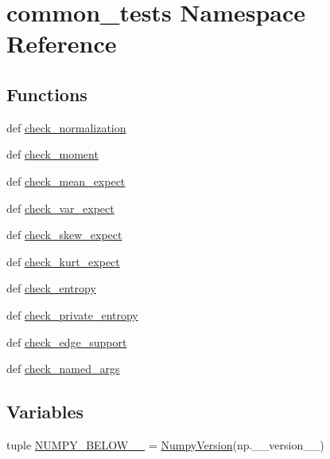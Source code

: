 \hypertarget{namespacecommon__tests}{}\section{common\+\_\+tests Namespace Reference}
\label{namespacecommon__tests}
\subsection*{Functions}
\begin{DoxyCompactItemize}
\item 
def \hyperlink{namespacecommon__tests_a8a5bd5cb9b9f81938b742d6a92508f01}{check\+\_\+normalization}
\item 
def \hyperlink{namespacecommon__tests_a24e7d5744f5a52cea9d94dac1453978c}{check\+\_\+moment}
\item 
def \hyperlink{namespacecommon__tests_a3b5de235c6d86d614e41aada38d5aa12}{check\+\_\+mean\+\_\+expect}
\item 
def \hyperlink{namespacecommon__tests_a172d6ae9ae9ba2d549aeaf00b774ddf3}{check\+\_\+var\+\_\+expect}
\item 
def \hyperlink{namespacecommon__tests_a35d5ac4a10a21e5b388c149d872e4578}{check\+\_\+skew\+\_\+expect}
\item 
def \hyperlink{namespacecommon__tests_a38730885c62e4d2e7b0e690a72b0965f}{check\+\_\+kurt\+\_\+expect}
\item 
def \hyperlink{namespacecommon__tests_ade4965492fd0058471e3dd5aea204fec}{check\+\_\+entropy}
\item 
def \hyperlink{namespacecommon__tests_a69e9f9a4d773bb8c200148e5eec2a5d8}{check\+\_\+private\+\_\+entropy}
\item 
def \hyperlink{namespacecommon__tests_a75607e0974246770b8876b0d329800c4}{check\+\_\+edge\+\_\+support}
\item 
def \hyperlink{namespacecommon__tests_a7253ad563e2940665f5ce541ca37c94a}{check\+\_\+named\+\_\+args}
\end{DoxyCompactItemize}
\subsection*{Variables}
\begin{DoxyCompactItemize}
\item 
tuple \hyperlink{namespacecommon__tests_a01ec1aef1ac4746b1eeb6f519a0c7fb2}{N\+U\+M\+P\+Y\+\_\+\+B\+E\+L\+O\+W\+\_\+\_} = \hyperlink{classscipy_1_1lib_1_1__version_1_1NumpyVersion}{Numpy\+Version}(np.\+\_\+\+\_\+version\+\_\+\+\_\+)
\end{DoxyCompactItemize}


